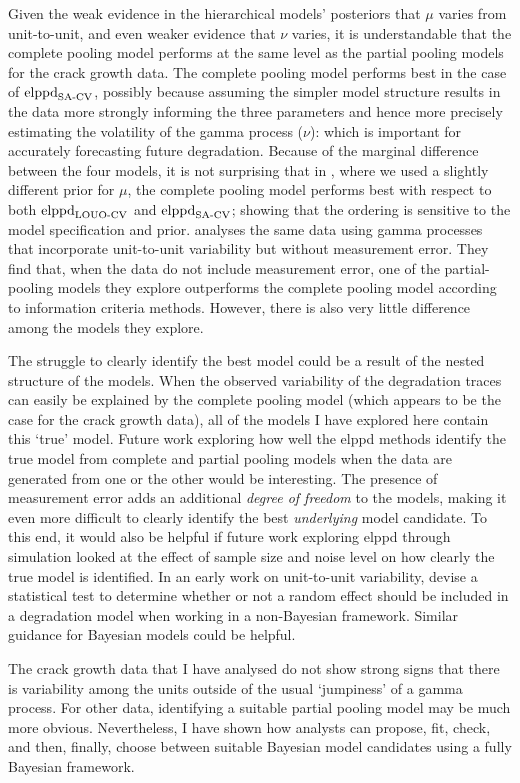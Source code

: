 Given the weak evidence in the hierarchical models' posteriors that $\mu$ varies from unit-to-unit, and even weaker evidence that $\nu$ varies, it is understandable that the complete pooling model performs at the same level as the partial pooling models for the crack growth data. The complete pooling model performs best in the case of $\hbox{elppd}_\text{SA-CV}$, possibly because assuming the simpler model structure results in the data more strongly informing the three parameters and hence more precisely estimating the volatility of the gamma process ($\nu$): which is important for accurately forecasting future degradation. Because of the marginal difference between the four models, it is not surprising that in \citet{leadbetter2024}, where we used a slightly different prior for $\mu$, the complete pooling model performs best with respect to both $\hbox{elppd}_\text{LOUO-CV}$ and $\hbox{elppd}_\text{SA-CV}$; showing that the ordering is sensitive to the model specification and prior. \citet{rodriguez-picon2018} analyses the same data using gamma processes that incorporate unit-to-unit variability but without measurement error. They find that, when the data do not include measurement error, one of the partial-pooling models they explore outperforms the complete pooling model according to information criteria methods. However, there is also very little difference among the models they explore.

The struggle to clearly identify the best model could be a result of the nested structure of the models. When the observed variability of the degradation traces can easily be explained by the complete pooling model (which appears to be the case for the crack growth data), all of the models I have explored here contain this `true' model. Future work exploring how well the elppd methods identify the true model from complete and partial pooling models when the data are generated from one or the other would be interesting. The presence of measurement error adds an additional \emph{degree of freedom} to the models, making it even more difficult to clearly identify the best \emph{underlying} model candidate. To this end, it would also be helpful if future work exploring elppd through simulation looked at the effect of sample size and noise level on how clearly the true model is identified. In an early work on unit-to-unit variability, \citet{lawless2004} devise a statistical test to determine whether or not a random effect should be included in a degradation model when working in a non-Bayesian framework. Similar guidance for Bayesian models could be helpful.

The crack growth data that I have analysed do not show strong signs that there is variability among the units outside of the usual `jumpiness' of a gamma process. For other data, identifying a suitable partial pooling model may be much more obvious. Nevertheless, I have shown how analysts can propose, fit, check, and then, finally, choose between suitable Bayesian model candidates using a fully Bayesian framework.

